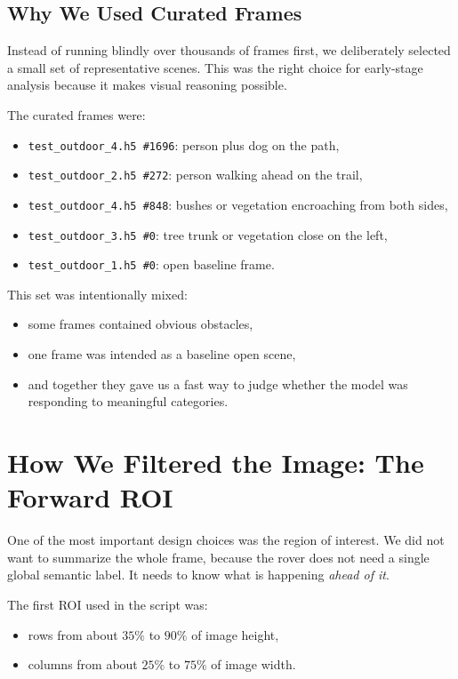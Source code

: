 \documentclass[11pt]{article}
\begin{document}
\subsection{Why We Used Curated Frames}
Instead of running blindly over thousands of frames first, we deliberately selected a small set of representative scenes. This was the right choice for early-stage analysis because it makes visual reasoning possible.

The curated frames were:
\begin{itemize}[leftmargin=*]
\item \texttt{test\_outdoor\_4.h5 \#1696}: person plus dog on the path,
\item \texttt{test\_outdoor\_2.h5 \#272}: person walking ahead on the trail,
\item \texttt{test\_outdoor\_4.h5 \#848}: bushes or vegetation encroaching from both sides,
\item \texttt{test\_outdoor\_3.h5 \#0}: tree trunk or vegetation close on the left,
\item \texttt{test\_outdoor\_1.h5 \#0}: open baseline frame.
\end{itemize}

This set was intentionally mixed:
\begin{itemize}[leftmargin=*]
\item some frames contained obvious obstacles,
\item one frame was intended as a baseline open scene,
\item and together they gave us a fast way to judge whether the model was responding to meaningful categories.
\end{itemize}

\section{How We Filtered the Image: The Forward ROI}
One of the most important design choices was the region of interest. We did not want to summarize the whole frame, because the rover does not need a single global semantic label. It needs to know what is happening \emph{ahead of it}.

The first ROI used in the script was:
\begin{itemize}[leftmargin=*]
\item rows from about $35\%$ to $90\%$ of image height,
\item columns from about $25\%$ to $75\%$ of image width.
\end{itemize}
\end{document}
